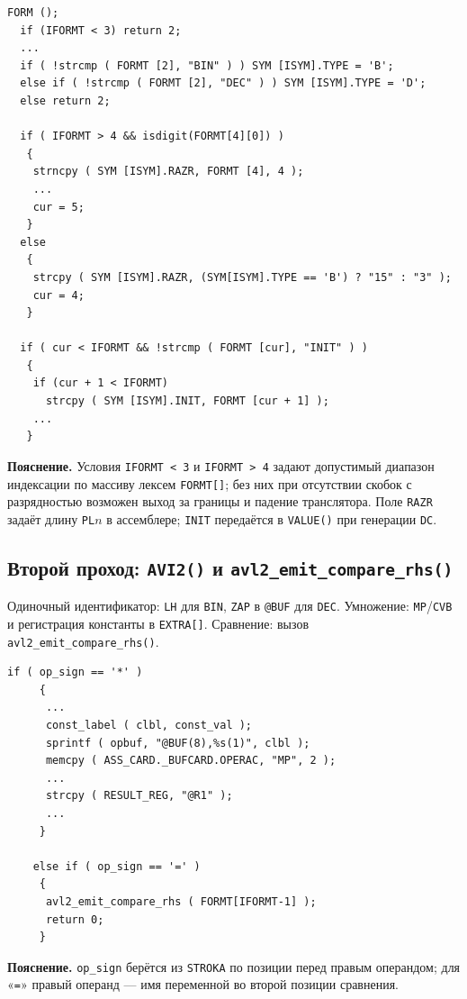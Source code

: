 \documentclass[a4paper,14pt]{extarticle}
\begin{document}
\begin{lstlisting}[style=Cstyle,caption={Заполнение \texttt{SYM[]} по объявлению (границы \texttt{IFORMT})},label=lst:odc1]
  FORM ();
  if (IFORMT < 3) return 2;
  ...
  if ( !strcmp ( FORMT [2], "BIN" ) ) SYM [ISYM].TYPE = 'B';
  else if ( !strcmp ( FORMT [2], "DEC" ) ) SYM [ISYM].TYPE = 'D';
  else return 2;

  if ( IFORMT > 4 && isdigit(FORMT[4][0]) ) 
   {
    strncpy ( SYM [ISYM].RAZR, FORMT [4], 4 );
    ...
    cur = 5; 
   } 
  else 
   {
    strcpy ( SYM [ISYM].RAZR, (SYM[ISYM].TYPE == 'B') ? "15" : "3" );
    cur = 4; 
   }

  if ( cur < IFORMT && !strcmp ( FORMT [cur], "INIT" ) )
   {
    if (cur + 1 < IFORMT) 
      strcpy ( SYM [ISYM].INIT, FORMT [cur + 1] );
    ...
   }
\end{lstlisting}
\textbf{Пояснение.} Условия \texttt{IFORMT~<~3} и \texttt{IFORMT~>~4} задают
допустимый диапазон индексации по массиву лексем \texttt{FORMT[]}; без них при
отсутствии скобок с разрядностью возможен выход за границы и падение
транслятора. Поле \texttt{RAZR} задаёт длину \texttt{PL$n$} в ассемблере;
\texttt{INIT} передаётся в \texttt{VALUE()} при генерации \texttt{DC}.

\subsection{Второй проход: \texttt{AVI2()} и \texttt{avl2\_emit\_compare\_rhs()}}

Одиночный идентификатор: \texttt{LH} для \texttt{BIN}, \texttt{ZAP} в \texttt{@BUF}
для \texttt{DEC}. Умножение: \texttt{MP}/\texttt{CVB} и регистрация константы в
\texttt{EXTRA[]}. Сравнение: вызов \texttt{avl2\_emit\_compare\_rhs()}.

\begin{lstlisting}[style=Cstyle,caption={Фрагмент \texttt{AVI2()}: умножение и сравнение},label=lst:avi2]
    if ( op_sign == '*' )
     {
      ...
      const_label ( clbl, const_val );
      sprintf ( opbuf, "@BUF(8),%s(1)", clbl );
      memcpy ( ASS_CARD._BUFCARD.OPERAC, "MP", 2 );
      ...
      strcpy ( RESULT_REG, "@R1" );
      ...
     }

    else if ( op_sign == '=' )
     {
      avl2_emit_compare_rhs ( FORMT[IFORMT-1] );
      return 0;
     }
\end{lstlisting}
\textbf{Пояснение.} \texttt{op\_sign} берётся из \texttt{STROKA} по позиции перед
правым операндом; для «\texttt{=}» правый операнд — имя переменной во второй
позиции сравнения.
\end{document}
